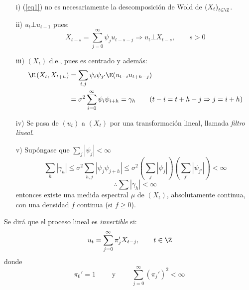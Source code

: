 \begin{observacion}
\quad
\begin{enumerate}
\item[i)] (\ref{eq1}) no es necesariamente la descomposici\'{o}n de Wold de $\left( {X_{t} } \right)_{t\in \Z} $.
\item[ii)] $u_{t}\bot u_{t-1}$ pues:
\[
X_{t-s} =\sum_{j=0}^\infty {\psi_{j} u_{t-s-j} \Longrightarrow u_{t} \bot X_{t-s} ,} \qquad s>0
\]

\item[iii)] $(X_{t} )$ d.e., pues es centrado y adem\'{a}s:
\begin{align*}
 \E\left( {X_{t} ,X_{t+h} } \right)
	 &=\sum_{i,j} {\psi_{i} \psi_{j'} \E(u_{t-i} u_{t+h-j} )} \\
	 &=\sigma^{2}\sum_{i=0}^\infty {\psi_{i} \psi_{i+h} =\gamma_{h} } 
\qquad
(t-i=t+h-j\Rightarrow j=i+h)
\end{align*}

\item[iv)] Se pasa de $\left( {u_{t} } \right)$ a $\left( {X_{t} } \right)$ por una transformaci\'{o}n lineal, llamada \emph{filtro lineal}.
\item[v)] Sup\'{o}ngase que $\sum_j {\left| {\psi_{j} } \right|<\infty } $
\[
\sum_h {\left| {\gamma_{h} } \right|\le \sigma^{2}\sum_{h,j} 
{\left| {\psi_{j} \psi_{j+h} } \right|} } \le \sigma^{2}\left( 
{\sum_j {\left| {\psi_{j} } \right|} } \right)\left( 
{\sum_{j'} {\left| {\psi_{j'} } \right|} } \right)<\infty 
\]
\[
\therefore\sum {\left| {\gamma_{h} } \right|<\infty } 
\]
entonces existe una medida espectral $\mu$ de $\left(X_{t}\right)$, absolutamente continua, con una densidad $f$ continua (si $f\geq 0$).
\end{enumerate}

\end{observacion}

\begin{definicion}
Se dir\'{a} que el proceso lineal es \emph{invertible} si:
\[
u_{t} =\sum_{j=0}^\infty {\pi_{j}' X_{t-j}, \qquad t\in \Z} 
\]
donde 
\[
\pi_{0}' =1 \qquad\text{ y }\qquad  \sum_{j=0}^\infty \left( \pi_{j}' \right)^{2} <\infty 
\]
\end{definicion}

